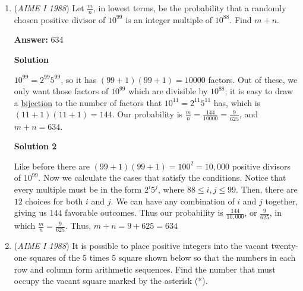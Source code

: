 \begin{enumerate}
 



\textbf{Solution 4 (Similar to 3)}

Note as long as $x_i < 1$ then we can set two terms $x_i, x_j$ as opposites on the number line and the result follows. That then implies for all even $n$ that $|x_1+\dots+x_n| + 19 = 19$ hence $\sum |x_i| \geq 19$. Equality holds if all $x_i = 1$ but we have the property $x_i < 1$. So, we must account for this with one more term $x_i$ making $n = \boxed{20} \quad \square$.

 


	\item (\textit{AIME I 1988}) Let $\frac{m}{n}$, in lowest terms, be the probability that a randomly chosen positive divisor of $10^{99}$ is an integer multiple of $10^{88}$. Find $m + n$.


 
 \textbf{Answer: }634



\textbf{Solution}

$10^{99} = 2^{99}5^{99}$, so it has $(99 + 1)(99 + 1) = 10000$ factors. Out of these, we only want those factors of $10^{99}$ which are divisible by $10^{88}$; it is easy to draw a \href{https://artofproblemsolving.com/wiki/index.php?title=Bijection}{bijection} to the number of factors that $10^{11} = 2^{11}5^{11}$ has, which is $(11 + 1)(11 + 1) = 144$. Our probability is $\frac{m}{n} = \frac{144}{10000} = \frac{9}{625}$, and $m + n = \boxed{634}$.

 



\textbf{Solution 2}

Like before there are \( (99+1)(99+1) = 100^2 = 10,000 \) positive divisors of \( 10^{99} \). Now we calculate the cases that satisfy the conditions. Notice that every multiple must be in the form \( 2^i 5^j \), where \( 88 \le i, j \le 99 \). Then, there are \( 12 \) choices for both \( i \) and \( j \). We can have any combination of \( i \) and \( j \) together, giving us \( 144 \) favorable outcomes. Thus our probability is \( \frac{144}{10,000} \), or \( \frac{9}{625} \), in which \( \frac{m}{n} = \frac{9}{625} \). Thus, \( m+n = 9+625 = \boxed{634} \)

 


	\item (\textit{AIME I 1988}) It is possible to place positive integers into the vacant twenty-one squares of the 5 times 5 square shown below so that the numbers in each row and column form arithmetic sequences. Find the number that must occupy the vacant square marked by the asterisk (*).



\end{enumerate}
